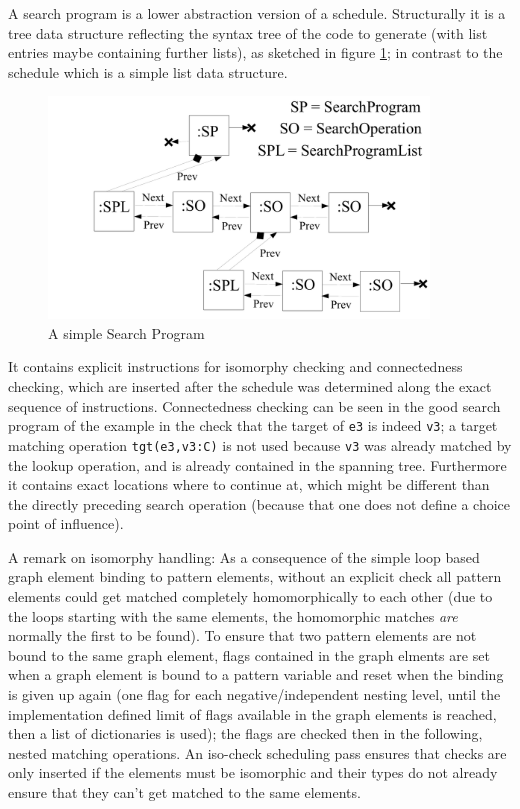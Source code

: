 A search program is a lower abstraction version of a schedule.
Structurally it is a tree data structure reflecting the syntax tree of the code to generate (with list entries maybe containing further lists), as sketched in figure \ref{figsearchprogram}; in contrast to the schedule which is a simple list data structure.

\begin{figure}[htbp]
  \centering
  \includegraphics[width=0.9\textwidth]{fig/SearchProgram}
  \caption{A simple Search Program}
  \label{figsearchprogram}
\end{figure}

It contains explicit instructions for isomorphy checking and connectedness checking, which are inserted after the schedule was determined along the exact sequence of instructions.
Connectedness checking can be seen in the good search program of the example in the check that the target of \texttt{e3} is indeed \texttt{v3};
a target matching operation \texttt{tgt(e3,v3:C)} is not used because \texttt{v3} was already matched by the lookup operation, and is already contained in the spanning tree.
Furthermore it contains exact locations where to continue at, which might be different than the directly preceding search operation (because that one does not define a choice point of influence).

A remark on isomorphy handling: As a consequence of the simple loop based graph element binding to pattern elements, without an explicit check all pattern elements could get matched completely homomorphically to each other (due to the loops starting with the same elements, the homomorphic matches \emph{are} normally the first to be found).
To ensure that two pattern elements are not bound to the same graph element, flags contained in the graph elments are set when a graph element is bound to a pattern variable and reset when the binding is given up again (one flag for each negative/independent nesting level, until the implementation defined limit of flags available in the graph elements is reached, then a list of dictionaries is used); the flags are checked then in the following, nested matching operations. An iso-check scheduling pass ensures that checks are only inserted if the elements must be isomorphic and their types do not already ensure that they can't get matched to the same elements.


